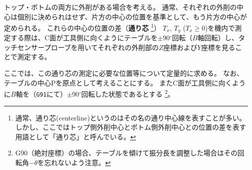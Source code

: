 

トップ・ボトムの両方に外削がある場合を考える。
通常、それぞれの外削の中心は個別に決められはせず、片方の中心の位置を基準として、もう片方の中心が定められる。
これらの中心の位置の差（\textbf{通り芯}
\footnote{通常、通り芯(centerline)というのはその名の通り中心線を表すことが多い。
しかし、ここではトップ側外削中心とボトム側外削中心との位置の差を表す用語として「通り芯」と呼んでいる。}）
$T_x$, $T_y$ ($T_x \geq 0$)を機内で測定する際は、C面が工具側に向くようにテーブルを$\pm$90$^\circ$回転（$B$軸回転）し、タッチセンサープローブを用いてそれぞれの外削部の$Z$座標および$Y$座標を見ることで測定する。

ここでは、この通り芯の測定に必要な位置等について定量的に求める。
なお、テーブルの中心Pを原点として考えることにする。
またC面が工具側に向くように$B$軸を（\verb|G91|にて）$\pm$90$^\circ$回転した状態であるとする
\footnote{{\ttfamily G90}（絶対座標）の場合、テーブルを傾けて振分長を調整した場合はその回転角$-\theta$を忘れないよう注意。}。



